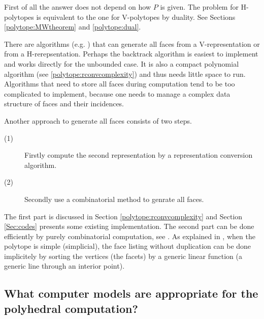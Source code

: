 \documentclass[a4paper,12pt]{article}
\begin{document}
First of all the answer does not depend on how $P$ is given.
The problem for H-polytopes is equivalent to
the one for V-polytopes by duality.
See Sections \ref{polytope:MWtheorem} and \ref{polytope:dual}.

There are algorithms (e.g. \cite{r-dchhd-92,s-chdch-86,flm-abala-97} )
that can generate all faces from
a V-representation or from a H-rerepsentation.  Perhaps the backtrack
algorithm \cite{flm-abala-97} is easiest to implement and works
directly for the unbounded case.  It is also
a compact polynomial algorithm (see \ref{polytope:rconvcomplexity})
and thus needs little space to run.
Algorithms that need to store all faces during computation
tend to be too complicated to
implement, because one needs to manage a complex
data structure of faces and their incidences.

Another approach to generate all faces consists of
two steps. 
\begin{description}
  \item [(1)] Firstly compute the second representation by a representation
conversion algorithm.
  \item [(2)] Secondly use a combinatorial method to genrate all
faces.
\end{description}
The first part is discussed in Section \ref{polytope:rconvcomplexity} and 
Section \ref{Sec:codes} presents some existing implementation.  
The second part can be done efficiently by
purely combinatorial computation, see \cite{fr-cfecp-94}.
As explained in \cite{fr-cfecp-94}, 
when the polytope is simple (simplicial), the face listing without
duplication can be done implicitely by sorting the vertices (the facets)
by a generic linear function (a generic line through an interior
point).  


\subsection{What computer models are appropriate
for the polyhedral computation?} \label{polytope:computermodel}
\end{document}
